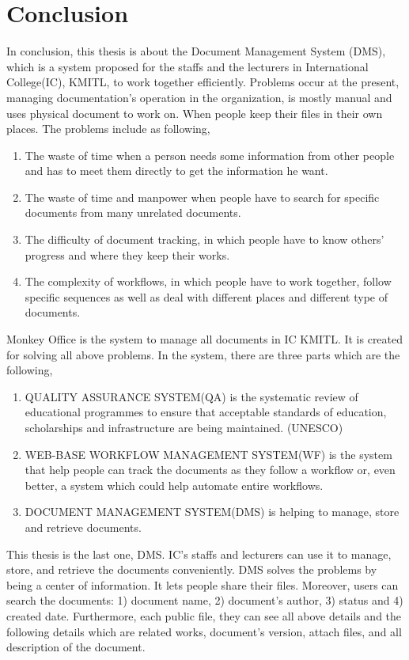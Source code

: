 \chapter{Conclusion}

In conclusion, this thesis is about the Document Management System (DMS), which is a system proposed for the staffs and the lecturers in International College(IC), KMITL, to work together efficiently. Problems occur at the present, managing documentation's operation in the organization, is mostly manual and uses physical document to work on. When people keep their files in their own places. The problems include as following,
\begin{enumerate}
\item The waste of time when a person needs some information from other people and has to meet them directly to get the information he want.
\item The waste of time and manpower when people have to search for specific documents from many unrelated documents.
\item The difficulty of document tracking, in which people have to know others' progress and where they keep their works.
\item The complexity of workflows, in which people have to work together, follow specific sequences as well as deal with different places and different type of documents.
\end{enumerate} 


Monkey Office is the system to manage all documents in IC KMITL. It is created for solving all above problems. In the system, there are three parts which are the following,
\begin{enumerate}
	\item QUALITY ASSURANCE SYSTEM(QA) is the systematic review of educational programmes to ensure that acceptable standards of education, scholarships and infrastructure are being maintained. (UNESCO) %

	\item WEB-BASE WORKFLOW MANAGEMENT SYSTEM(WF) is the system that help people can track the documents as they follow a workflow or, even better, a system which could help automate entire workflows. 

	\item DOCUMENT MANAGEMENT SYSTEM(DMS) is helping to manage, store and retrieve documents. 
\end{enumerate}

This thesis is the last one, DMS. IC's staffs and lecturers can use it to manage, store, and retrieve the documents conveniently. DMS solves the problems by being a center of information. It lets people share their files. Moreover, users can search the documents: 1) document name, 2) document's author, 3) status and 4) created date.
Furthermore, each public file, they can see all above details and the following details which are related works, document's version, attach files, and all description of the document. %


